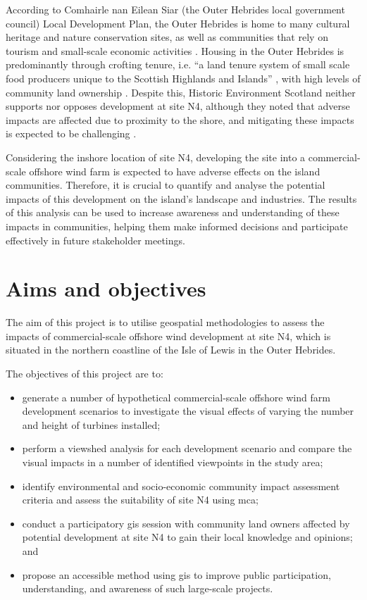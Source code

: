 According to Comhairle nan Eilean Siar (the Outer Hebrides local government council) Local Development Plan, the Outer Hebrides is home to many cultural heritage and nature conservation sites, as well as communities that rely on tourism and small-scale economic activities \autocite{cnes-ldp}. Housing in the Outer Hebrides is predominantly through crofting tenure, i.e. ``a land tenure system of small scale food producers unique to the Scottish Highlands and Islands'' \autocite{crofting}, with high levels of community land ownership \autocite{cnes-ldp}. Despite this, Historic Environment Scotland neither supports nor opposes development at site N4, although they noted that adverse impacts are affected due to proximity to the shore, and mitigating these impacts is expected to be challenging \autocite{govscot-smpresponses}.

Considering the inshore location of site N4, developing the site into a commercial-scale offshore wind farm is expected to have adverse effects on the island communities. Therefore, it is crucial to quantify and analyse the potential impacts of this development on the island's landscape and industries. The results of this analysis can be used to increase awareness and understanding of these impacts in communities, helping them make informed decisions and participate effectively in future stakeholder meetings.

\section{Aims and objectives}

The aim of this project is to utilise geospatial methodologies to assess the impacts of commercial-scale offshore wind development at site N4, which is situated in the northern coastline of the Isle of Lewis in the Outer Hebrides.

\noindent The objectives of this project are to:

\begin{itemize}[noitemsep]
  \item generate a number of hypothetical commercial-scale offshore wind farm development scenarios to investigate the visual effects of varying the number and height of turbines installed;
  \item perform a viewshed analysis for each development scenario and compare the visual impacts in a number of identified viewpoints in the study area;
  \item identify environmental and socio-economic community impact assessment criteria and assess the suitability of site N4 using \gls{mca};
  \item conduct a participatory \gls{gis} session with community land owners affected by potential development at site N4 to gain their local knowledge and opinions; and
  \pagebreak
  \item propose an accessible method using \gls{gis} to improve public participation, understanding, and awareness of such large-scale projects.
\end{itemize}
